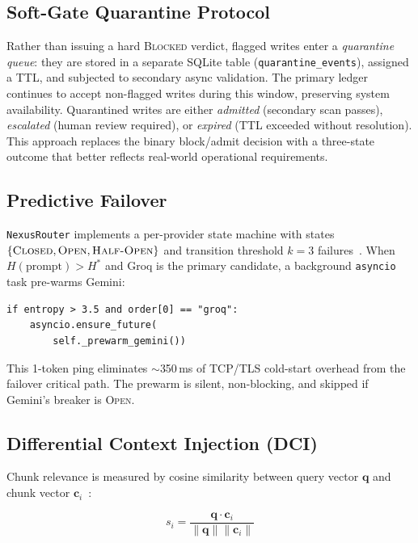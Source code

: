 \documentclass[11pt,twocolumn]{article}
\begin{document}
\subsection{Soft-Gate Quarantine Protocol}

Rather than issuing a hard \textsc{Blocked} verdict, flagged writes
enter a \emph{quarantine queue}: they are stored in a separate
SQLite table (\texttt{quarantine\_events}), assigned a TTL, and
subjected to secondary async validation. The primary ledger continues
to accept non-flagged writes during this window, preserving system
availability. Quarantined writes are either \emph{admitted} (secondary
scan passes), \emph{escalated} (human review required), or
\emph{expired} (TTL exceeded without resolution). This approach
replaces the binary block/admit decision with a three-state outcome
that better reflects real-world operational requirements.

\subsection{Predictive Failover}

\texttt{NexusRouter} implements a per-provider state machine with
states $\{\textsc{Closed}, \textsc{Open}, \textsc{Half\text{-}Open}\}$
and transition threshold $k=3$ failures~\cite{nygard2007}.
When $H(\text{prompt}) > H^{*}$ and Groq is the primary candidate, a
background \texttt{asyncio} task pre-warms Gemini:

\begin{verbatim}
if entropy > 3.5 and order[0] == "groq":
    asyncio.ensure_future(
        self._prewarm_gemini())
\end{verbatim}

This 1-token ping eliminates $\sim$350\,ms of TCP/TLS cold-start
overhead from the failover critical path. The prewarm is silent,
non-blocking, and skipped if Gemini's breaker is \textsc{Open}.

\subsection{Differential Context Injection (DCI)}

Chunk relevance is measured by cosine similarity between query vector
$\mathbf{q}$ and chunk vector $\mathbf{c}_i$~\cite{reimers2019sbert}:

\begin{equation}
  s_i = \frac{\mathbf{q} \cdot \mathbf{c}_i}
             {\|\mathbf{q}\| \|\mathbf{c}_i\|}
  \label{eq:cosine}
\end{equation}
\end{document}
